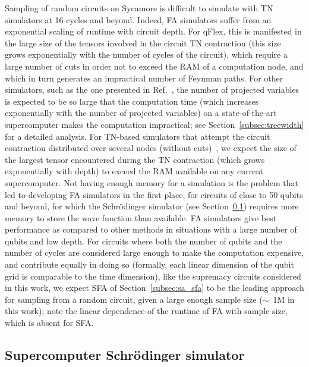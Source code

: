 Sampling of random circuits on Sycamore is difficult to simulate with TN simulators at 16 cycles and beyond.  Indeed, FA simulators suffer from an exponential scaling of runtime with circuit depth. For qFlex, this is manifested in the large size of the tensors involved in the circuit TN contraction (this size grows exponentially with the number of cycles of the circuit), which require a large number of cuts in order not to exceed the RAM of a computation node, and which in turn generates an impractical number of Feynman paths. For other simulators, such as the one presented in Ref.~\cite{chen2018classical}, the number of projected variables is expected to be so large that the computation time (which increases exponentially with the number of projected variables) on a state-of-the-art supercomputer makes the computation impractical; see Section~\ref{subsec:treewidth} for a detailed analysis. For TN-based simulators that attempt the circuit contraction distributed over several nodes (without cuts)~\cite{guo2019general}, we expect the size of the largest tensor encountered during the TN contraction (which grows exponentially with depth) to exceed the RAM available on any current supercomputer. Not having enough memory for a simulation is the problem that led to developing FA simulators in the first place, for circuits of close to 50 qubits and beyond, for which the Schr\"odinger simulator (see Section~\ref{subsec:sa_simulator}) requires more memory to store the wave function than available. FA simulators give best performance as compared to other methods in situations with a large number of qubits and low depth. For circuits where both the number of qubits and the number of cycles are considered large enough to make the computation expensive, and contribute equally in doing so (formally, each linear dimension of the qubit grid is comparable to the time dimension), like the supremacy circuits considered in this work, we expect SFA of Section~\ref{subsec:sa_sfa} to be the leading approach for sampling from a random circuit, given a large enough sample size ($\sim$~1M in this work); note the linear dependence of the runtime of FA with sample size, which is absent for SFA.

\subsection{Supercomputer Schr\"odinger simulator}
\label{subsec:sa_simulator}


